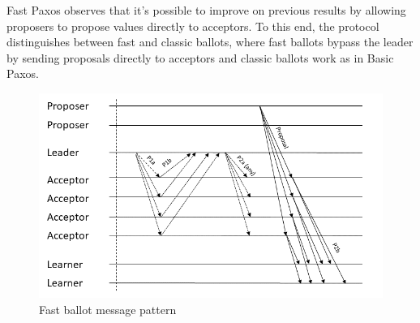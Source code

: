Fast Paxos observes that it's possible to improve on previous results by allowing proposers to propose values directly to acceptors. To this end, the protocol distinguishes between fast and classic ballots, where fast ballots bypass the leader by sending proposals directly to acceptors and classic ballots work as in Basic Paxos. 
\begin{figure}
	\centering
	\includegraphics[width=\textwidth*2/3]{Figures/fast_paxos}
	\caption{Fast ballot message pattern}
	\label{fast_paxos_fig}
\end{figure}
